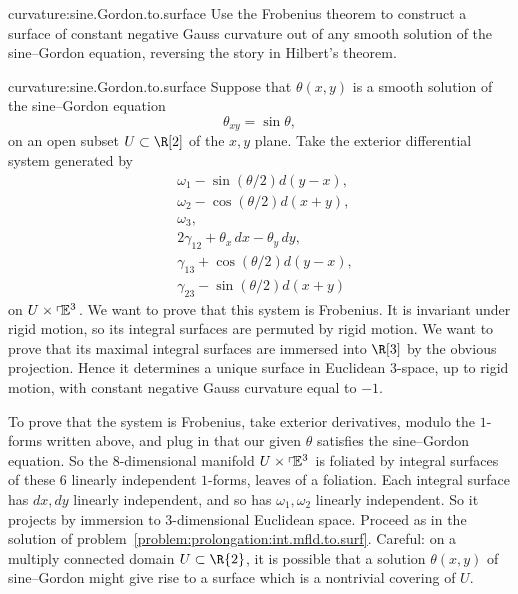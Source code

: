 \begin{problem}{curvature:sine.Gordon.to.surface}
Use the Frobenius theorem to construct a surface of constant negative Gauss curvature out of any smooth solution of the sine--Gordon equation, reversing the story in Hilbert's theorem.
\end{problem}
\begin{answer}{curvature:sine.Gordon.to.surface}
Suppose that \(\theta(x,y)\) is a smooth solution of the sine--Gordon equation 
\[
\theta_{xy}=\sin \theta,
\]
on an open subset \(U\subset\R[2]\) of the \(x,y\) plane.
Take the exterior differential system generated by
\begin{align*}
&\omega_1-\sin(\theta/2)d(y-x),\\
&\omega_2-\cos(\theta/2)d(x+y),\\
&\omega_3,\\
&2\gamma_{12}+\theta_x\,dx-\theta_y\,dy,\\
&\gamma_{13}+\cos(\theta/2)d(y-x),\\
&\gamma_{23}-\sin(\theta/2)d(x+y)
\end{align*}
on \(U\times\left\ulcorner\!\mathbb{E}^{3}\right.\).
We want to prove that this system is Frobenius.
It is invariant under rigid motion, so its integral surfaces are permuted by rigid motion.
We want to prove that its maximal integral surfaces are immersed into \(\R[3]\) by the obvious projection.
Hence it determines a unique surface in Euclidean \(3\)-space, up to rigid motion, with constant negative Gauss curvature equal to \(-1\).

To prove that the system is Frobenius, take exterior derivatives, modulo the \(1\)-forms written above, and plug in that our given \(\theta\) satisfies the sine--Gordon equation.
So the \(8\)-dimensional manifold \(U\times\left\ulcorner\!\mathbb{E}^{3}\right.\) is foliated by integral surfaces of these \(6\) linearly independent \(1\)-forms, leaves of a foliation.
Each integral surface has \(dx,dy\) linearly independent, and so has \(\omega_1,\omega_2\) linearly independent.
So it projects by immersion to \(3\)-dimensional Euclidean space.
Proceed as in the solution of problem~\vref{problem:prolongation:int.mfld.to.surf}.
Careful: on a multiply connected domain \(U\subset\R{2}\), it is possible that a solution \(\theta(x,y)\) of sine--Gordon might give rise to a surface which is a nontrivial covering of \(U\).
\end{answer}
